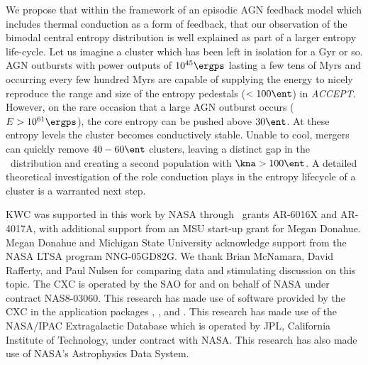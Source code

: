 \documentclass{emulateapj}
\newcommand{\accept}{\textit{ACCEPT}}
\begin{document}
We propose that within the framework of an episodic AGN feedback
model which includes thermal conduction as a form of feedback, that
our observation of the bimodal central entropy distribution is well
explained as part of a larger entropy life-cycle. Let us imagine a
cluster which has been left in isolation for a Gyr or so. AGN
outbursts with power outputs of $10^{45} \ergps$ lasting a few tens of
Myrs and occurring every few hundred Myrs are capable of supplying the
energy to nicely reproduce the range and size of the entropy pedestals
($< 100 \ent$) in \accept. However, on the rare occasion that a large
AGN outburst occurs ($E > 10^{61} \ergps$), the core entropy can be
pushed above $30 \ent$. At these entropy levels the cluster becomes
conductively stable. Unable to cool, mergers can quickly remove
$40-60 \ent$ clusters, leaving a distinct gap in the \kna\
distribution and creating a second population with $\kna > 100
\ent$. A detailed theoretical investigation of the role conduction
plays in the entropy lifecycle of a cluster is a warranted next step.

\acknowledgements

\acknowledgements
KWC was supported in this work by NASA through \Chandra\ grants
AR-6016X and AR-4017A, with additional support from an MSU start-up
grant for Megan Donahue. Megan Donahue and Michigan State University
acknowledge support from the NASA LTSA program NNG-05GD82G.  We thank
Brian McNamara, David Rafferty, and Paul Nulsen for comparing data and
stimulating discussion on this topic. The CXC is operated by the SAO
for and on behalf of NASA under contract NAS8-03060. This research has
made use of software provided by the CXC in the application packages
\Ciao, \chips, and \sherpa. This research has made use of the
NASA/IPAC Extragalactic Database which is operated by JPL, California
Institute of Technology, under contract with NASA. This research has
also made use of NASA's Astrophysics Data System.





\clearpage


\end{document}
